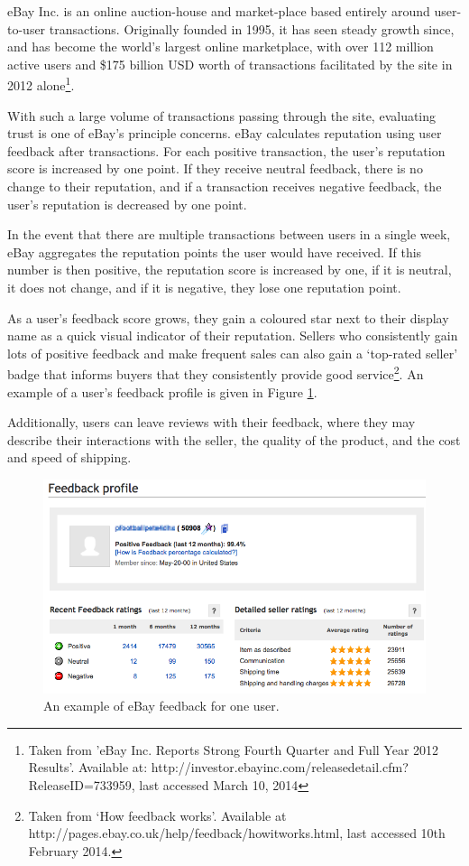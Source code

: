 \documentclass[]{final_report}
\begin{document}
eBay Inc. is an online auction-house and market-place based entirely around user-to-user transactions. Originally founded in 1995, it has seen steady growth since, and has become the world's largest online marketplace, with over 112 million active users and \$175 billion USD worth of transactions facilitated by the site in 2012 alone\footnote{Taken from 'eBay Inc. Reports Strong Fourth Quarter and Full Year 2012 Results'. Available at: http://investor.ebayinc.com/releasedetail.cfm?ReleaseID=733959, last accessed March 10, 2014}.

With such a large volume of transactions passing through the site, evaluating trust is one of eBay's principle concerns. eBay calculates reputation using user feedback after transactions. For each positive transaction, the user's reputation score is increased by one point. If they receive neutral feedback, there is no change to their reputation, and if a transaction receives negative feedback, the user's reputation is decreased by one point.

In the event that there are multiple transactions between users in a single week, eBay aggregates the reputation points the user would have received. If this number is then positive, the reputation score is increased by one, if it is neutral, it does not change, and if it is negative, they lose one reputation point.

As a user's feedback score grows, they gain a coloured star next to their display name as a quick visual indicator of their reputation. Sellers who consistently gain lots of positive feedback and make frequent sales can also gain a `top-rated seller' badge that informs buyers that they consistently provide good service\footnote{Taken from `How feedback works'. Available at http://pages.ebay.co.uk/help/feedback/howitworks.html, last accessed 10th February 2014.}. An example of a user's feedback profile is given in Figure \ref{gra:ebay}.

Additionally, users can leave reviews with their feedback, where they may describe their interactions with the seller, the quality of the product, and the cost and speed of shipping.

\begin{figure}[ht!]
\centering
\includegraphics[width=140mm]{chap2/ebayfeedback.PNG}
\caption{An example of eBay feedback for one user.}
\label{gra:ebay}
\end{figure}
\end{document}
